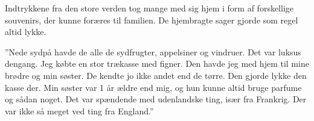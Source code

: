 Indtrykkene fra den store verden tog mange med sig hjem i form af
forskellige souvenirs, der kunne foræres til familien. De hjembragte
sager gjorde som regel altid lykke.

''Nede sydpå havde de alle de sydfrugter, appelsiner og vindruer. Det
var luksus dengang. Jeg købte en stor trækasse med figner. Den havde jeg
med hjem til mine brødre og min søster. De kendte jo ikke andet end de
tørre. Den gjorde lykke den kasse der. Min søster var 1 år ældre end
mig, og hun kunne altid bruge parfume og sådan noget. Det var spændende
med udenlandske ting, især fra Frankrig. Der var ikke så meget ved ting
fra England.''
